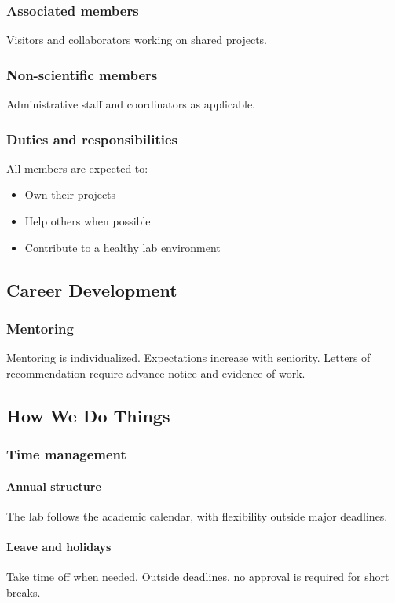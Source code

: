 \documentclass[11pt]{article}
\begin{document}
\subsubsection{Associated members}
Visitors and collaborators working on shared projects.

\subsubsection{Non-scientific members}
Administrative staff and coordinators as applicable.

\subsubsection{Duties and responsibilities}
All members are expected to:
\begin{itemize}
  \item Own their projects
  \item Help others when possible
  \item Contribute to a healthy lab environment
\end{itemize}

\subsection{Career Development}

\subsubsection{Mentoring}
Mentoring is individualized.
Expectations increase with seniority.
Letters of recommendation require advance notice and evidence of work.

\subsection{How We Do Things}

\subsubsection{Time management}

\paragraph{Annual structure}
The lab follows the academic calendar, with flexibility outside major deadlines.

\paragraph{Leave and holidays}
Take time off when needed.
Outside deadlines, no approval is required for short breaks.
\end{document}
